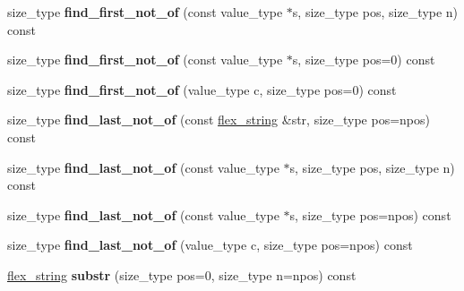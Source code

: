 \begin{DoxyCompactItemize}
\item 
\hypertarget{classflex__string_a9b8faa063095ab210907bd412f10ca97}{}size\+\_\+type {\bfseries find\+\_\+first\+\_\+not\+\_\+of} (const value\+\_\+type $\ast$s, size\+\_\+type pos, size\+\_\+type n) const \label{classflex__string_a9b8faa063095ab210907bd412f10ca97}

\item 
\hypertarget{classflex__string_af1de4015dee37c3701dd9a584c3ecec0}{}size\+\_\+type {\bfseries find\+\_\+first\+\_\+not\+\_\+of} (const value\+\_\+type $\ast$s, size\+\_\+type pos=0) const \label{classflex__string_af1de4015dee37c3701dd9a584c3ecec0}

\item 
\hypertarget{classflex__string_aaa4a33fb78a972fd35e2ccb516acb243}{}size\+\_\+type {\bfseries find\+\_\+first\+\_\+not\+\_\+of} (value\+\_\+type c, size\+\_\+type pos=0) const \label{classflex__string_aaa4a33fb78a972fd35e2ccb516acb243}

\item 
\hypertarget{classflex__string_a0fbd1499e22573baaa4a898af9fb74f0}{}size\+\_\+type {\bfseries find\+\_\+last\+\_\+not\+\_\+of} (const \hyperlink{classflex__string}{flex\+\_\+string} \&str, size\+\_\+type pos=npos) const \label{classflex__string_a0fbd1499e22573baaa4a898af9fb74f0}

\item 
\hypertarget{classflex__string_a93b5a4ed5c87d796464bac3478097e47}{}size\+\_\+type {\bfseries find\+\_\+last\+\_\+not\+\_\+of} (const value\+\_\+type $\ast$s, size\+\_\+type pos, size\+\_\+type n) const \label{classflex__string_a93b5a4ed5c87d796464bac3478097e47}

\item 
\hypertarget{classflex__string_aae94881140d9f2d5d42f1c8eb1025a41}{}size\+\_\+type {\bfseries find\+\_\+last\+\_\+not\+\_\+of} (const value\+\_\+type $\ast$s, size\+\_\+type pos=npos) const \label{classflex__string_aae94881140d9f2d5d42f1c8eb1025a41}

\item 
\hypertarget{classflex__string_a915850aff970bc869f3b4d0b1619988a}{}size\+\_\+type {\bfseries find\+\_\+last\+\_\+not\+\_\+of} (value\+\_\+type c, size\+\_\+type pos=npos) const \label{classflex__string_a915850aff970bc869f3b4d0b1619988a}

\item 
\hypertarget{classflex__string_a0239419ef31036fa3e96884f4d4da315}{}\hyperlink{classflex__string}{flex\+\_\+string} {\bfseries substr} (size\+\_\+type pos=0, size\+\_\+type n=npos) const \label{classflex__string_a0239419ef31036fa3e96884f4d4da315}


\end{DoxyCompactItemize}
